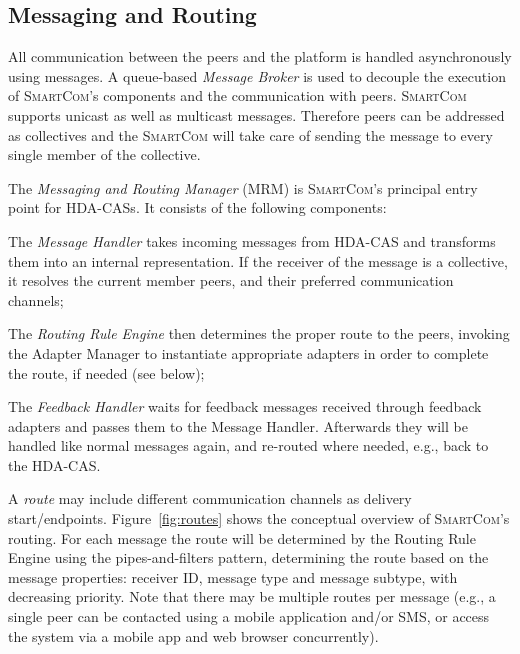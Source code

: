 \documentclass{llncs}
\newcommand{\mdl}{\textsc{SmartCom}}
\begin{document}
  \subsection{Messaging and Routing}
  \label{sec:middleware:routing}

    All communication between the peers and the platform is handled asynchronously using messages. A queue-based \emph{Message Broker} is used to decouple the execution of \mdl's components and the communication with peers. 
    \mdl{} supports unicast as well as multicast messages. Therefore peers can be addressed as collectives and the \mdl{} will take care of sending the message to every single member of the collective. 
	
    The \emph{Messaging and Routing Manager} (MRM) is \mdl's principal entry point for HDA-CASs. It consists of the following components:
    \begin{inparaenum}
      \item The \emph{Message Handler} takes incoming messages from HDA-CAS and transforms them into an internal representation. If the receiver of the message is a collective, it resolves the current member peers, and their preferred communication channels; 
      \item The \emph{Routing Rule Engine} then determines the proper route to the peers, invoking the Adapter Manager to instantiate appropriate adapters in order to complete the route, if needed (see below); 
      \item The \emph{Feedback Handler} waits for feedback messages received through feedback adapters and  passes them to the Message Handler. Afterwards they will be handled like normal messages again, and re-routed where needed, e.g., back to the HDA-CAS.
    \end{inparaenum}

    
    A \emph{route} may include different communication channels as delivery start/endpoints. Figure~\ref{fig:routes} shows the conceptual overview of \mdl's routing. For each message the route will be determined by the Routing Rule Engine using the pipes-and-filters pattern, determining the route based on the  message properties: receiver ID, message type and message subtype, with decreasing priority. 
    Note that there may be multiple routes per message (e.g., a single peer can be contacted using a mobile application and/or SMS, or access the system via a mobile app and web browser concurrently).
\end{document}
